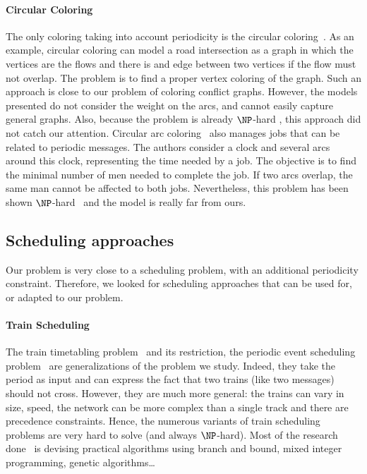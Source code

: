 \paragraph{Circular Coloring}
The only coloring taking into account periodicity is the circular coloring~\cite{ZHU2001371,zhou2013multiple}. As an example, circular coloring can model a road intersection as a graph in which the vertices are the flows and there is and edge between two vertices if the flow must not overlap. The problem is to find a proper vertex coloring of the graph. Such an approach is close to our problem of coloring conflict graphs. However, the models presented do not consider the weight on the arcs, and cannot easily capture general graphs. Also, because the problem is already $\NP$-hard , this approach did not catch our attention.
Circular arc coloring~\cite{10.2307/2100446} also manages jobs that can be related to periodic messages. The authors consider a clock and several arcs around this clock, representing the time needed by a job. The objective is to find the minimal number of men needed to complete the job. If two arcs overlap, the same man cannot be affected to both jobs. Nevertheless, this problem has been shown $\NP$-hard~\cite{10.1007/BFb0053971} and the model is really far from ours.

\subsection{Scheduling approaches}
Our problem is very close to a scheduling problem, with an additional periodicity constraint. Therefore, we looked for scheduling approaches that can be used for, or adapted to our problem.

\paragraph{Train Scheduling}

The train timetabling problem~\cite{lusby2011railway} and its restriction, the periodic event scheduling problem~\cite{serafini1989mathematical} are generalizations of the problem we study. Indeed, they take the period as input and can express the fact that two trains (like two messages) should not cross. However, they are much more general: the trains can vary in size, speed, the network can be more complex than a single track and there are precedence constraints. Hence, the numerous variants of train scheduling problems are very hard to solve (and always $\NP$-hard). Most of the research done~\cite{lusby2011railway} is devising practical algorithms using branch and bound, mixed integer programming, genetic algorithms\dots

